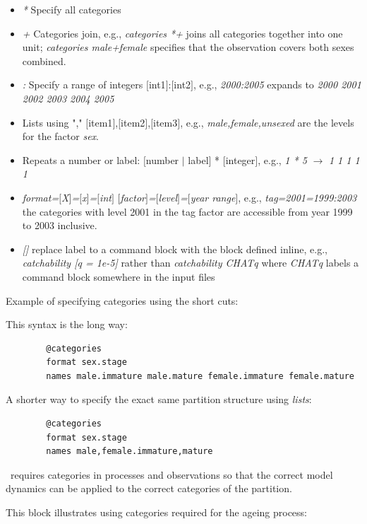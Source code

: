\begin{itemize}
	\item \textit{*} Specify all categories
	\item \textit{+} Categories join, e.g., \textit{categories *+} joins all categories together into one unit; \textit{categories male+female}
specifies that the observation covers both sexes combined.
    \item \textit{:} Specify a range of integers $[$int1$]$:$[$int2$]$, e.g., \textit{2000:2005} expands to \textit{2000 2001 2002 2003 2004 2005}
    \item Lists using "," $[$item1$]$,$[$item2$]$,$[$item3$]$, e.g., \textit{male,female,unsexed} are the levels for the factor \textit{sex}.
    \item Repeats a number or label: $[$number $\mid$ label$]$ * $[$integer$]$, e.g., \textit{1 * 5} $\rightarrow$ \textit{1 1 1 1 1}
    \item \textit{format=$[$X$]$=$[$x$]$=$[$int$]$}   
    \textit{$[$factor$]$=$[$level$]$=$[$year range$]$}, e.g., \textit{tag=2001=1999:2003} the categories with level 2001 in the tag factor are accessible from year 1999 to 2003 inclusive.
    \item \textit{[]} replace label to a command block with the block defined inline, e.g., \textit{catchability [q = 1e-5]} rather than \textit{catchability CHATq} where \textit{CHATq} labels a command block somewhere in the input files
\end{itemize}


Example of specifying categories using the short cuts:

This syntax is the long way:
{\small{\begin{verbatim}
		@categories
		format sex.stage
		names male.immature male.mature female.immature female.mature
\end{verbatim}}}

A shorter way to specify the exact same partition structure  using \textit{lists}:

{\small{\begin{verbatim}
		@categories
		format sex.stage
		names male,female.immature,mature
\end{verbatim}}}

\CNAME\ requires categories in processes and observations so that the correct model dynamics can be applied to the correct categories of the partition.

\ifAgeBased
This block illustrates using categories required for the ageing process:

